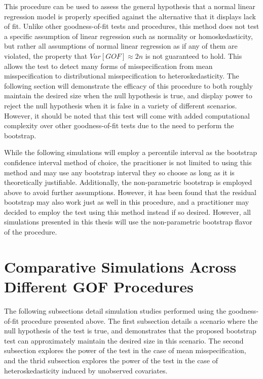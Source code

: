 		This procedure can be used to assess the general hypothesis that a normal linear regression model is properly specified against the alternative that it displays lack of fit.
		Unlike other goodness-of-fit tests and procedures, this method does not test a specific assumption of linear regression such as normality or homoskedasticity, but rather
		all assumptions of normal linear regression as if any of them are violated, the property that $Var[GOF] \approx 2n$ is not guaranteed to hold. This allows the test to detect
		many forms of misspecification from mean misspecification to distributional misspecification to heteroskedasticity. The following section will demonstrate the efficacy of
		this procedure to both roughly maintain the desired size when the null hypothesis is true, and display power to reject the null hypothesis when it is false in a variety of different
		scenarios. However, it should be noted that this test will come with added computational complexity over other goodness-of-fit tests due to the need to perform the bootstrap.
		
		While the following simulations will employ a percentile interval as the bootstrap confidence interval method of choice, the pracitioner is not limited to using this method
		and may use any bootstrap interval they so choose as long as it is theoretically justifiable. Additionally, the non-parametric bootstrap is employed above to avoid further
		assumptions. However, it has been found that the residual bootstrap may also work just as well in this procedure, and a practitioner may decided to employ the test
		using this method instead if so desired. However, all simulations presented in this thesis will use the non-parametric bootstrap flavor of the procedure.
		
		\section{Comparative Simulations Across Different GOF Procedures} \label{sec:gof_sim}

		The following subsections detail simulation studies performed using the goodness-of-fit procedure presented above. The first subsection details a scenario where the null
		hypothesis of the test is true, and demonstrates that the proposed bootstrap test can approximately maintain the desired size in this scenario. The second subsection 
		explores the power of the test in the case of mean misspecification, and the thrid subsection explores the power of the test in the case of heteroskedasticity induced by
		unobserved covariates.

